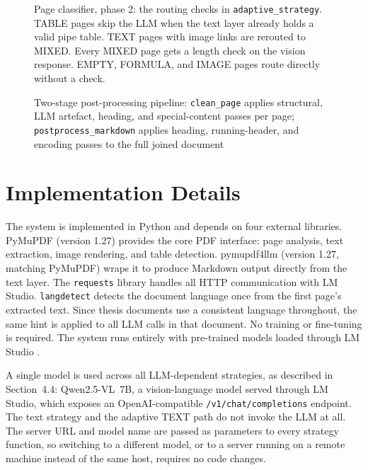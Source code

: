 \begin{figure}[H]
    \centering
    
    \caption[Page classifier, phase 2: the routing checks]{Page classifier, phase 2: the routing checks in \texttt{adaptive\_strategy}. TABLE pages skip the LLM when the text layer already holds a valid pipe table. TEXT pages with image links are rerouted to MIXED. Every MIXED page gets a length check on the vision response. EMPTY, FORMULA, and IMAGE pages route directly without a check.}
    \label{fig:routing}
\end{figure}

\begin{figure}[H]
    \centering
    
    \caption[Two-stage post-processing pipeline]{Two-stage post-processing pipeline: \texttt{clean\_page} applies structural, LLM artefact, heading, and special-content passes per page; \texttt{postprocess\_markdown} applies heading, running-header, and encoding passes to the full joined document}
    \label{fig:postprocessing}
\end{figure}

\section{Implementation Details}

The system is implemented in Python and depends on four external libraries.
PyMuPDF \autocite{pymupdf} (version 1.27) provides the core PDF interface: page analysis, text extraction, image rendering, and table detection.
pymupdf4llm \autocite{pymupdf4llm} (version 1.27, matching PyMuPDF) wraps it to produce Markdown output directly from the text layer.
The \texttt{requests} library handles all HTTP communication with LM Studio.
\texttt{langdetect} detects the document language once from the first page's extracted text. Since thesis documents use a consistent language throughout, the same hint is applied to all LLM calls in that document.
No training or fine-tuning is required. The system runs entirely with pre-trained models loaded through LM Studio \autocite{lmstudio}.

A single model is used across all LLM-dependent strategies, as described in
Section~4.4: Qwen2.5-VL~7B, a vision-language model served through LM Studio,
which exposes an OpenAI-compatible \texttt{/v1/chat/completions} endpoint. The
text strategy and the adaptive TEXT path do not invoke the LLM at all. The
server URL and model name are passed as parameters to every strategy
function, so switching to a different model, or to a server running on a
remote machine instead of the same host, requires no code changes.

